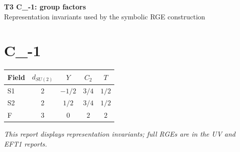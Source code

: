 \documentclass[10pt,a4paper]{article}
\begin{document}
\begin{center}
{\Large\bfseries T3 C\_-1: group factors}\\[4pt]
Representation invariants used by the symbolic RGE construction
\end{center}
\bigskip
\section*{C\_-1}
\begin{longtable}{@{}lcccc@{}}
\toprule Field & $d_{SU(2)}$ & $Y$ & $C_2$ & $T$ \\
\midrule
S1 & 2 & $-1/2$ & $3/4$ & $1/2$ \\
S2 & 2 & $1/2$ & $3/4$ & $1/2$ \\
F & 3 & $0$ & $2$ & $2$ \\
\bottomrule
\end{longtable}
\emph{This report displays representation invariants; full RGEs are in the UV and EFT1 reports.}
\end{document}
